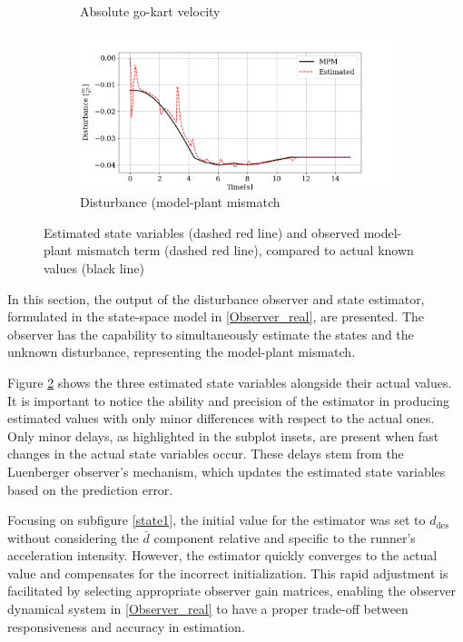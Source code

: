 \documentclass[a4paper,12pt,oneside]{book}
\begin{document}
\begin{figure}[h!]
\begin{subfigure}[b]{0.49\textwidth}
    \caption{Absolute go-kart velocity}
    \end{subfigure}
    \hfill
    \begin{subfigure}[b]{0.49\textwidth}
        \includegraphics[width=\textwidth]{Estimator/mpm.png}
    \caption{Disturbance (model-plant mismatch}
    \label{disturbance}
    \end{subfigure}
    \caption{Estimated state variables (dashed red line) and observed model-plant mismatch term (dashed red line), compared to actual known values (black line)}
\label{Estimator}
\end{figure}

In this section, the output of the disturbance observer and state estimator, formulated in the state-space model in \eqref{Observer_real}, are presented.
The observer has the capability to simultaneously estimate the states and the unknown disturbance, representing the model-plant mismatch.

Figure \ref{Estimator} shows the three estimated state variables alongside their actual values.
It is important to notice the ability and precision of the estimator in producing estimated values with only minor differences with respect to the actual ones.
Only minor delays, as highlighted in the subplot insets, are present when fast changes in the actual state variables occur.
These delays stem from the Luenberger observer's mechanism, which updates the estimated state variables based on the prediction error.

Focusing on subfigure \ref{state1}, the initial value for the estimator was set to $d_\text{des}$ without considering the $\bar{d}$ component relative and specific to the runner's acceleration intensity. 
However, the estimator quickly converges to the actual value and compensates for the incorrect initialization. 
This rapid adjustment is facilitated by selecting appropriate observer gain matrices, enabling the observer dynamical system in \eqref{Observer_real} to have a proper trade-off between responsiveness and accuracy in estimation.
\end{document}
